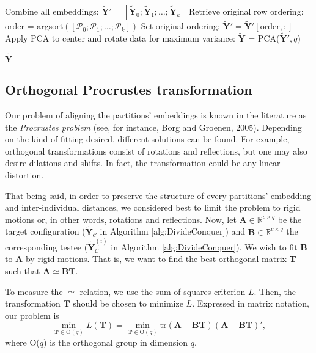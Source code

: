 \begin{algorithm}
\begin{algorithmic}[1]
    \STATE Combine all embeddings: $\mathbf{\tilde{Y}}' = [\mathbf{\tilde{Y}}_0; \mathbf{\tilde{Y}}_1; \ldots; \mathbf{\tilde{Y}}_k]$
    \STATE Retrieve original row ordering: order = argsort$([\mathcal{P}_0; \mathcal{P}_1; \ldots; \mathcal{P}_k])$
    \STATE Set original ordering: $\mathbf{\tilde{Y}}' = \mathbf{\tilde{Y}}'[\text{order},:]$
    \STATE Apply PCA to center and rotate data for maximum variance: $\mathbf{\tilde{Y}}$ = PCA($\mathbf{\tilde{Y}}', q$)
    
    \RETURN $\mathbf{\tilde{Y}}$
    \end{algorithmic}
\end{algorithm}

\subsection{Orthogonal Procrustes transformation}
\label{sec:Procrustes}

Our problem of aligning the partitions' embeddings is known in the literature as the \textit{Procrustes problem} (see, for instance, Borg and Groenen, 2005). Depending on the kind of fitting desired, different solutions can be found. For example, orthogonal transformations consist of rotations and reflections, but one may also desire dilations and shifts. In fact, the transformation could be any linear distortion.

That being said, in order to preserve the structure of every partitions' embedding and inter-individual distances, we considered best to limit the problem to rigid motions or, in other words, rotations and reflections. Now, let $\mathbf{A} \in \mathbb{R}^{c \times q}$ be the target configuration ($\mathbf{\tilde{Y}}_{\mathcal{C}}$ in Algorithm \ref{alg:DivideConquer}) and $\mathbf{B} \in \mathbb{R}^{c \times q}$ the corresponding testee ($\mathbf{\tilde{Y}}_{\mathcal{C}}^{(i)}$ in Algorithm \ref{alg:DivideConquer}). We wish to fit \textbf{B} to \textbf{A} by rigid motions. That is, we want to find the best orthogonal matrix \textbf{T} such that $\mathbf{A} \simeq \mathbf{BT}$.

To measure the $\simeq$ relation, we use the sum-of-squares criterion $L$. Then, the transformation $\mathbf{T}$ should be chosen to minimize $L$. Expressed in matrix notation, our problem is
$$
\min_{\mathbf{T} \in \text{O}(q)} L(\mathbf{T}) = \min_{\mathbf{T} \in \text{O}(q)} \text{tr}(\mathbf{A}-\mathbf{BT})(\mathbf{A}-\mathbf{BT})',
$$
where O($q$) is the orthogonal group in dimension $q$.

